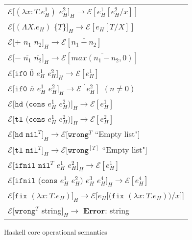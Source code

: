 \begin{figure}[t]
\centering
\begin{tabular}{l}
$\mathscr{E}[(\lambda x:T.e_{H}^{1})$ $e_{H}^{2}]_{H}\rightarrow\mathscr{E}[e_{H}^{1}[e_{H}^{2}/x]]$ \\

$\mathscr{E}[(\Lambda X.e_{H})$ $\lbrace T\rbrace]_{H}\rightarrow\mathscr{E}[e_{H}[T/X]]$ \\

$\mathscr{E}[+$ $\overline{n_{1}}$ $\overline{n_{2}}]_{H}\rightarrow\mathscr{E}[\overline{n_{1}+n_{2}}]$ \\

$\mathscr{E}[-$ $\overline{n_{1}}$ $\overline{n_{2}}]_{H}\rightarrow\mathscr{E}[\overline{max(n_{1}-n_{2},0)}]$ \\

$\mathscr{E}[\mathtt{if0}$ $\overline{0}$ $e_{H}^{1}$ $e_{H}^{2}]_{H}\rightarrow\mathscr{E}[e_{H}^{1}]$ \\

$\mathscr{E}[\mathtt{if0}$ $\overline{n}$ $e_{H}^{1}$ $e_{H}^{2}]_{H}\rightarrow\mathscr{E}[e_{H}^{2}]$ $(n\neq0)$ \\

$\mathscr{E}[\mathtt{hd}$ $(\mathtt{cons}$ $e_{H}^{1}$ $e_{H}^{2})]_{H}\rightarrow\mathscr{E}[e_{H}^{1}]$ \\

$\mathscr{E}[\mathtt{tl}$ $(\mathtt{cons}$ $e_{H}^{1}$ $e_{H}^{2})]_{H}\rightarrow\mathscr{E}[e_{H}^{2}]$ \\

$\mathscr{E}[\mathtt{hd}$ $\mathtt{nil}^{T}]_{H}\rightarrow\mathscr{E}[\mathtt{wrong}^{T}$ ``Empty list"$]$ \\

$\mathscr{E}[\mathtt{tl}$ $\mathtt{nil}^{T}]_{H}\rightarrow\mathscr{E}[\mathtt{wrong}^{[T]}$ ``Empty list"$]$ \\

$\mathscr{E}[\mathtt{ifnil}$ $\mathtt{nil}^{T}$ $e_{H}^{1}$ $e_{H}^{2}]_{H}\rightarrow\mathscr{E}[e_{H}^{1}]$ \\

$\mathscr{E}[\mathtt{ifnil}$ $(\mathtt{cons}$ $e_{H}^{1}$ $e_{H}^{2})$ $e_{H}^{3}$ $e_{H}^{4}]_{H}\rightarrow\mathscr{E}[e_{H}^{4}]$ \\

$\mathscr{E}[\mathtt{fix}$ $(\lambda x:T.e_{H})]_{H}\rightarrow\mathscr{E}[e_{H}[(\mathtt{fix}$ $(\lambda x:T.e_{H}))/x]]$ \\

$\mathscr{E}[\mathtt{wrong}^{T}$ string$]_{H}\rightarrow$ \textbf{Error}: string
\end{tabular}
\caption{Haskell core operational semantics}
\label{hcos}
\end{figure}